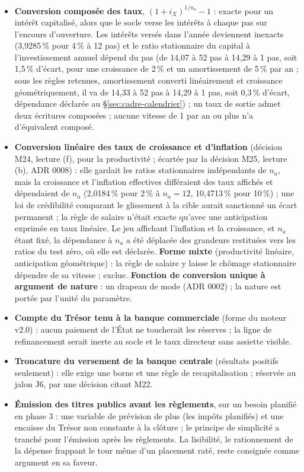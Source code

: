 \documentclass[11pt,a4paper]{article}
\begin{document}
\begin{itemize}
\item \textbf{Conversion composée des taux}, $(1 + i_X)^{1/n_a} - 1$ : exacte pour un intérêt capitalisé, alors que le socle verse les intérêts à chaque pas sur l'encours d'ouverture. Les intérêts versés dans l'année deviennent inexacts (3,9285\,\% pour 4\,\% à 12 pas) et le ratio stationnaire du capital à l'investissement annuel dépend du pas (de 14,07 à 52 pas à 14,29 à 1 pas, soit 1,5\,\% d'écart, pour une croissance de 2\,\% et un amortissement de 5\,\% par an ; sous les règles retenues, amortissement converti linéairement et croissance géométriquement, il va de 14,33 à 52 pas à 14,29 à 1 pas, soit 0,3\,\% d'écart, dépendance déclarée au \S\ref{sec:cadre-calendrier}) ; un taux de sortie admet deux écritures composées ; aucune vitesse de 1 par an ou plus n'a d'équivalent composé.
\item \textbf{Conversion linéaire des taux de croissance et d'inflation} (décision M24, lecture (f), pour la productivité ; écartée par la décision M25, lecture (b), ADR 0008) : elle gardait les ratios stationnaires indépendants de $n_a$, mais la croissance et l'inflation effectives différaient des taux affichés et dépendaient de $n_a$ (2,0184\,\% pour 2\,\% à $n_a = 12$, 10,4713\,\% pour 10\,\%) ; une loi de crédibilité comparant le glissement à la cible aurait sanctionné un écart permanent ; la règle de salaire n'était exacte qu'avec une anticipation exprimée en taux linéaire. Le jeu affichant l'inflation et la croissance, et $n_a$ étant fixé, la dépendance à $n_a$ a été déplacée des grandeurs restituées vers les ratios du test zéro, où elle est déclarée. \textbf{Forme mixte} (productivité linéaire, anticipation géométrique) : la règle de salaire y laisse le chômage stationnaire dépendre de sa vitesse ; exclue. \textbf{Fonction de conversion unique à argument de nature} : un drapeau de mode (ADR 0002) ; la nature est portée par l'unité du paramètre.
\item \textbf{Compte du Trésor tenu à la banque commerciale} (forme du moteur v2.0) : aucun paiement de l'État ne toucherait les réserves ; la ligne de refinancement serait inerte au socle et le taux directeur sans assiette visible.
\item \textbf{Troncature du versement de la banque centrale} (résultats positifs seulement) : elle exige une borne et une règle de recapitalisation ; réservée au jalon J6, par une décision citant M22.
\item \textbf{Émission des titres publics avant les règlements}, sur un besoin planifié en phase 3 : une variable de prévision de plus (les impôts planifiés) et une encaisse du Trésor non constante à la clôture ; le principe de simplicité a tranché pour l'émission après les règlements. La lisibilité, le rationnement de la dépense frappant le tour même d'un placement raté, reste consignée comme argument en sa faveur.

\end{itemize}
\end{document}
